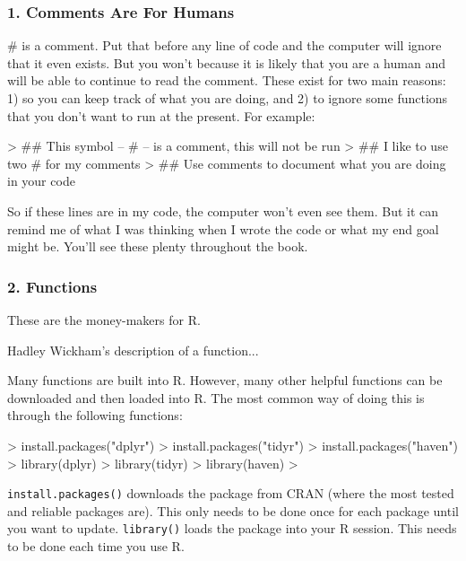 \documentclass{book}
\begin{document}
\subsubsection*{1. Comments Are For Humans}

\# is a comment. Put that before any line of code and the computer will ignore that it even exists. But you won't because it is likely that you are a human and will be able to continue to read the comment. These exist for two main reasons: 1) so you can keep track of what you are doing, and 2) to ignore some functions that you don't want to run at the present. For example:

\begin{Schunk}
\begin{Sinput}
> ## This symbol -- # -- is a comment, this will not be run
> ## I like to use two # for my comments
> ## Use comments to document what you are doing in your code
\end{Sinput}
\end{Schunk}

So if these lines are in my code, the computer won't even see them. But it can remind me of what I was thinking when I wrote the code or what my end goal might be. You'll see these plenty throughout the book.

\subsubsection*{2. Functions}

These are the money-makers for R. 

Hadley Wickham's description of a function...

Many functions are built into R. However, many other helpful functions can be downloaded and then loaded into R. The most common way of doing this is through the following functions:

\begin{Schunk}
\begin{Sinput}
> install.packages("dplyr")
> install.packages("tidyr")
> install.packages("haven")
> library(dplyr)
> library(tidyr)
> library(haven)
> 
\end{Sinput}
\end{Schunk}

\verb|install.packages()| downloads the package from CRAN (where the most tested and reliable packages are). This only needs to be done once for each package until you want to update. \verb|library()| loads the package into your R session. This needs to be done each time you use R.
\end{document}
